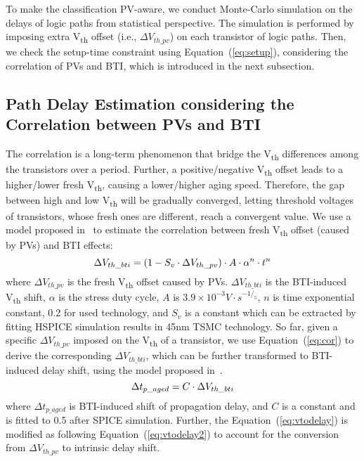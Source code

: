 To make the classification PV-aware, we conduct Monte-Carlo simulation on the delays of logic paths from statistical perspective. The simulation is performed by imposing extra V\textsubscript{th} offset (i.e., $\Delta V_{th\_pv}$) on each transistor of logic paths. Then, we check the setup-time constraint using Equation~(\ref{eq:setup}), considering the correlation of PVs and BTI, which is introduced in the next subsection. 

\subsection{Path Delay Estimation considering the Correlation between PVs and BTI}
\label{sec:frame:cor}
The correlation is a long-term phenomenon that bridge the V\textsubscript{th} differences among the transistors over a period. Further, a positive/negative V\textsubscript{th} offset leads to a higher/lower fresh V\textsubscript{th}, causing a lower/higher aging speed. Therefore, the gap between high and low V\textsubscript{th} will be gradually converged, letting threshold voltages of transistors, whose fresh ones are different, reach a convergent value. We use a model proposed in~\cite{gomez2016early} to estimate the correlation between fresh V\textsubscript{th} offset (caused by PVs) and BTI effects:
\begin{equation}
	\centering
	\fontsize{9}{9} \selectfont
	\Delta V_{th\_bti} = (1 - S_{v} \cdot \Delta V_{th\_pv})  \cdot A \cdot \alpha^n \cdot t^n
	\label{eq:cor}
\end{equation}
where $\Delta V_{th\_pv}$ is the fresh V\textsubscript{th} offset caused by PVs. $\Delta V_{th\_bti}$ is the BTI-induced V\textsubscript{th} shift, $\alpha$ is the stress duty cycle, $A$ is $3.9 \times 10^{-3} V \cdot s^{-1/_5}$, $n$ is time exponential constant, 0.2 for used technology, and $S_{v}$ is a constant which can be extracted by fitting HSPICE simulation results in 45nm TSMC technology. So far, given a specific $\Delta V_{th\_pv}$ imposed on the V\textsubscript{th} of a transistor, we use Equation~(\ref{eq:cor}) to derive the corresponding $\Delta V_{th\_bti}$, which can be further transformed to BTI-induced delay shift, using the model proposed in~\cite{wang2007efficient}.%
\begin{equation}
	\centering
	\fontsize{9}{9} \selectfont
	\Delta t_{p\_aged} = C \cdot \Delta V_{th\_bti}
	\label{eq:vtodelay}
\end{equation}	
where $\Delta t_{p\_aged}$ is BTI-induced shift of propagation delay, and $C$ is a constant and is fitted to 0.5 after SPICE simulation. Further, the Equation~(\ref{eq:vtodelay}) is modified as following Equation~(\ref{eq:vtodelay2}) to account for the conversion from $\Delta V_{th\_pv}$ to intrinsic delay shift. 
